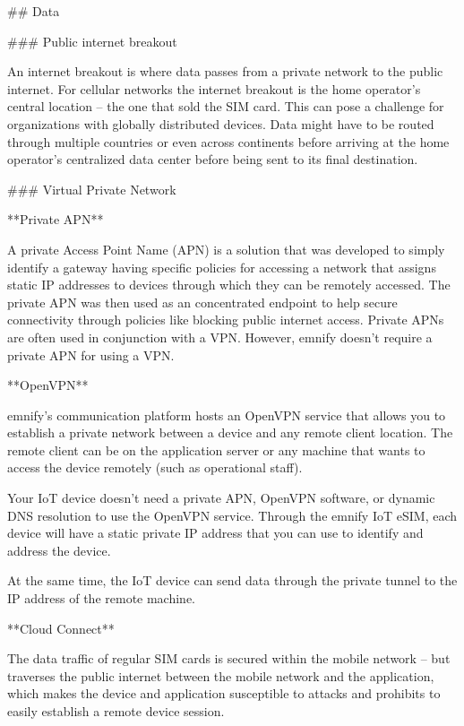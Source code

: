 \documentclass[11pt, oneside]{article}   	%
\begin{document}
\begin{markdown}

## Data

### Public internet breakout

An internet breakout is where data passes from a private network to the public internet.
For cellular networks the internet breakout is the home operator's central location -- the one that sold the SIM card.
This can pose a challenge for organizations with globally distributed devices.
Data might have to be routed through multiple countries or even across continents before arriving at the home operator's centralized data center before being sent to its final destination.

### Virtual Private Network

**Private APN**

A private Access Point Name (APN) is a solution that was developed to simply identify a gateway having specific policies for accessing a network that assigns static IP addresses to devices through which they can be remotely accessed.
The private APN was then used as an concentrated endpoint to help secure connectivity through policies like blocking public internet access.
Private APNs are often used in conjunction with a VPN.
However, emnify doesn't require a private APN for using a VPN.

**OpenVPN**

emnify's communication platform hosts an OpenVPN service that allows you to establish a private network between a device and any remote client location.
The remote client can be on the application server or any machine that wants to access the device remotely (such as operational staff).

Your IoT device doesn't need a private APN, OpenVPN software, or dynamic DNS resolution to use the OpenVPN service.
Through the emnify IoT eSIM, each device will have a static private IP address that you can use to identify and address the device.

At the same time, the IoT device can send data through the private tunnel to the IP address of the remote machine.

**Cloud Connect**

The data traffic of regular SIM cards is secured within the mobile network -- but traverses the public internet between the mobile network and the application, which makes the device and application susceptible to attacks and prohibits to easily establish a remote device session.


\end{markdown}
\end{document}
